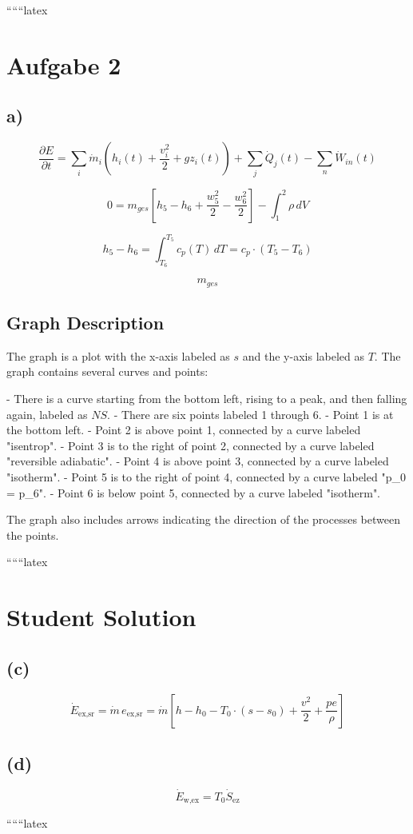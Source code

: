 
``````latex


\section*{Aufgabe 2}

\subsection*{a)}

\begin{equation*}
\frac{\partial E}{\partial t} = \sum_i \dot{m}_i (h_i(t) + \frac{v_i^2}{2} + g z_i(t)) + \sum_j \dot{Q}_j(t) - \sum_n \dot{W}_{in}(t)
\end{equation*}

\begin{equation*}
0 = m_{ges} \left[ h_5 - h_6 + \frac{w_5^2}{2} - \frac{w_6^2}{2} \right] - \int_1^2 \rho \, dV
\end{equation*}

\begin{equation*}
h_5 - h_6 = \int_{T_6}^{T_5} c_p(T) \, dT = c_p \cdot (T_5 - T_6)
\end{equation*}

\begin{equation*}
m_{ges}
\end{equation*}

\subsection*{Graph Description}

The graph is a plot with the x-axis labeled as $s$ and the y-axis labeled as $T$. The graph contains several curves and points:

- There is a curve starting from the bottom left, rising to a peak, and then falling again, labeled as $NS$.
- There are six points labeled 1 through 6.
- Point 1 is at the bottom left.
- Point 2 is above point 1, connected by a curve labeled "isentrop".
- Point 3 is to the right of point 2, connected by a curve labeled "reversible adiabatic".
- Point 4 is above point 3, connected by a curve labeled "isotherm".
- Point 5 is to the right of point 4, connected by a curve labeled "p_0 = p_6".
- Point 6 is below point 5, connected by a curve labeled "isotherm".

The graph also includes arrows indicating the direction of the processes between the points.

``````latex


\section*{Student Solution}

\subsection*{(c)}
\[
\dot{E}_{\text{ex,sr}} = \dot{m} \, e_{\text{ex,sr}} = \dot{m} \left[ h - h_0 - T_0 \cdot (s - s_0) + \frac{v^2}{2} + \frac{pe}{\rho} \right]
\]

\subsection*{(d)}
\[
\dot{E}_{\text{w,ex}} = T_0 \dot{S}_{\text{ez}}
\]

``````latex


